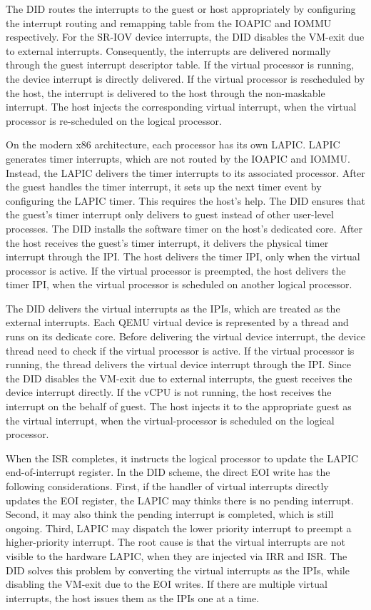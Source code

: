 The DID routes the interrupts to the guest or host
appropriately by configuring the interrupt routing and
remapping table from the IOAPIC and IOMMU respectively. For
the SR-IOV device interrupts, the DID disables the VM-exit due
to external interrupts. Consequently, the interrupts are
delivered normally through the guest interrupt descriptor
table. If the virtual processor is running, the device
interrupt is directly delivered. If the virtual processor is
rescheduled by the host, the interrupt is delivered to the
host through the non-maskable interrupt. The host injects the
corresponding virtual interrupt, when the virtual processor is
re-scheduled on the logical processor.

On the modern x86 architecture, each processor has its own
LAPIC. LAPIC generates timer interrupts, which are not routed
by the IOAPIC and IOMMU. Instead, the LAPIC delivers the timer
interrupts to its associated processor. After the guest
handles the timer interrupt, it sets up the next timer event
by configuring the LAPIC timer. This requires the host's help.
The DID ensures that the guest's timer interrupt only delivers
to guest instead of other user-level processes. The DID
installs the software timer on the host's dedicated core.
After the host receives the guest's timer interrupt, it
delivers the physical timer interrupt through the IPI. The
host delivers the timer IPI, only when the virtual processor
is active. If the virtual processor is preempted, the host
delivers the timer IPI, when the virtual processor is
scheduled on another logical processor.

The DID delivers the virtual interrupts as the IPIs, which are
treated as the external interrupts. Each QEMU virtual device
is represented by a thread and runs on its dedicate core.
Before delivering the virtual device interrupt, the device
thread need to check if the virtual processor is active. If
the virtual processor is running, the thread delivers the
virtual device interrupt through the IPI. Since the DID
disables the VM-exit due to external interrupts, the guest
receives the device interrupt directly. If the vCPU is not
running, the host receives the interrupt on the behalf of
guest. The host injects it to the appropriate guest as the
virtual interrupt, when the virtual-processor is scheduled on
the logical processor.

When the ISR completes, it instructs the logical processor to
update the LAPIC end-of-interrupt register. In the DID scheme,
the direct EOI write has the following considerations. First,
if the handler of virtual interrupts directly updates the EOI
register, the LAPIC may thinks there is no pending interrupt.
Second, it may also think the pending interrupt is completed,
which is still ongoing. Third, LAPIC may dispatch the lower
priority interrupt to preempt a higher-priority interrupt. The
root cause is that the virtual interrupts are not visible to
the hardware LAPIC, when they are injected via IRR and ISR.
The DID solves this problem by converting the virtual
interrupts as the IPIs, while disabling the VM-exit due to the
EOI writes. If there are multiple virtual interrupts, the host
issues them as the IPIs one at a time.

